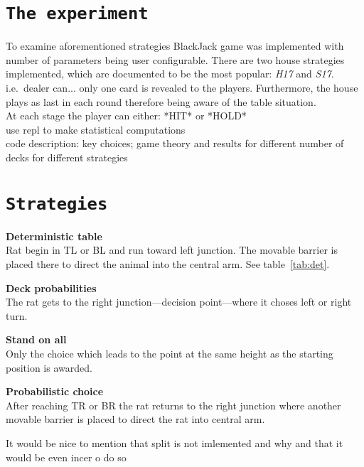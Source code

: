 \documentclass[12pt,a4paper,twocolumn]{article}
\begin{document}
\section*{\texttt{The experiment}}
To examine aforementioned strategies BlackJack game was implemented with number of parameters being user configurable. There are two house strategies implemented, which are documented to be the most popular: \emph{H17} and \emph{S17}. i.e.\ dealer can... only one card is revealed to the players. Furthermore, the house plays as last in each round therefore being aware of the table situation.\\

At each stage the player can either:  *HIT* or *HOLD*\\

use repl to make statistical computations\\

code description: key choices; game theory and results for different number of decks for different strategies\\

\section*{\texttt{Strategies}}

\begin{description}
\item{\textbf{Deterministic table}} \hfill\\
Rat begin in TL or BL and run toward left junction. The movable barrier is placed there to direct the animal into the central arm. See table~\ref{tab:det}.
\item{\textbf{Deck probabilities}} \hfill\\
The rat gets to the right junction---decision point---where it choses left or right turn.
\item{\textbf{Stand on all}} \hfill\\
Only the choice which leads to the point at the same height as the starting position is awarded.
\item{\textbf{Probabilistic choice}} \hfill\\
After reaching TR or BR the rat returns to the right junction where another movable barrier is placed to direct the rat into central arm.
\end{description}

It would be nice to mention that split is not imlemented and why and that it would be even incer o do so
\end{document}
